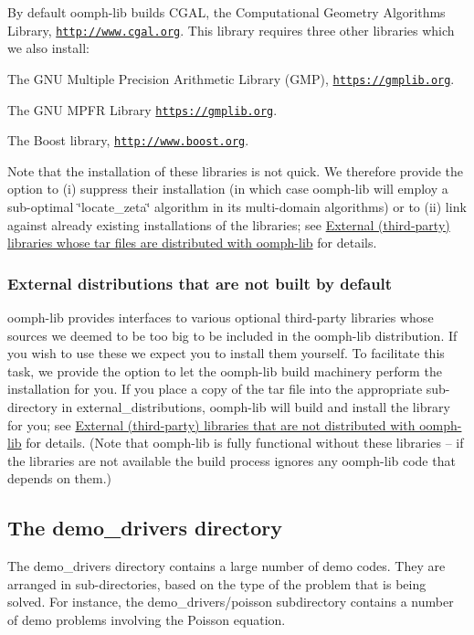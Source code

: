 By default {\ttfamily oomph-\/lib} builds C\+G\+AL, the Computational Geometry Algorithms Library, \href{http://www.cgal.org}{\tt http\+://www.\+cgal.\+org}. This library requires three other libraries which we also install\+:
\begin{DoxyItemize}
\item The G\+NU Multiple Precision Arithmetic Library (G\+MP), \href{https://gmplib.org}{\tt https\+://gmplib.\+org}.
\item The G\+NU M\+P\+FR Library \href{http://www.mpfr.org}{\tt https\+://gmplib.\+org}.
\item The Boost library, \href{http://www.boost.org}{\tt http\+://www.\+boost.\+org}.
\end{DoxyItemize}Note that the installation of these libraries is not quick. We therefore provide the option to (i) suppress their installation (in which case {\ttfamily oomph-\/lib} will employ a sub-\/optimal \char`\"{}locate\+\_\+zeta\char`\"{} algorithm in its multi-\/domain algorithms) or to (ii) link against already existing installations of the libraries; see \hyperlink{index_external_dist_cgal_etc}{External (third-\/party) libraries whose tar files are distributed with oomph-\/lib} for details.\hypertarget{index_trilinos_hypre_external}{}\subsubsection{External distributions that are not built by default}\label{index_trilinos_hypre_external}
{\ttfamily oomph-\/lib} provides interfaces to various optional third-\/party libraries whose sources we deemed to be too big to be included in the {\ttfamily oomph-\/lib} distribution. If you wish to use these we expect you to install them yourself. To facilitate this task, we provide the option to let the {\ttfamily oomph-\/lib} build machinery perform the installation for you. If you place a copy of the tar file into the appropriate sub-\/directory in {\ttfamily external\+\_\+distributions}, {\ttfamily oomph-\/lib} will build and install the library for you; see \hyperlink{index_external_dist}{External (third-\/party) libraries that are not distributed with oomph-\/lib} for details. (Note that {\ttfamily oomph-\/lib} is fully functional without these libraries -- if the libraries are not available the build process ignores any {\ttfamily oomph-\/lib} code that depends on them.)\hypertarget{index_demo_drivers}{}\subsection{The demo\+\_\+drivers directory}\label{index_demo_drivers}
The {\ttfamily demo\+\_\+drivers} directory contains a large number of demo codes. They are arranged in sub-\/directories, based on the type of the problem that is being solved. For instance, the {\ttfamily demo\+\_\+drivers/poisson} subdirectory contains a number of demo problems involving the Poisson equation.

